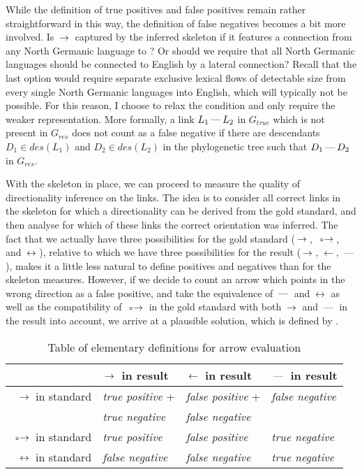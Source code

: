 While the definition of true positives and false positives remain rather straightforward in this way, the definition of false negatives becomes a bit more involved. Is  $\arrowLA$  captured by the inferred skeleton if it features a connection from any North Germanic language to ? Or should we require that all North Germanic languages should be connected to English by a lateral connection? Recall that the last option would require separate exclusive lexical flows of detectable size from every single North Germanic languages into English, which will typically not be possible. For this reason, I choose to relax the condition and only require the weaker representation. More formally, a link $L_1 \arrowLL L_2$ in $G_{true}$ which is not present in $G_{res}$ does not count as a false negative if there are descendants $D_1 \in des(L_1)$ and $D_2 \in des(L_2)$ in the phylogenetic tree such that $D_1 \arrowLL D_2$ in $G_{res}$.

With the skeleton in place, we can proceed to measure the quality of directionality inference on the links. The idea is to consider all correct links in the skeleton for which a directionality can be derived from the gold standard, and then analyse for which of these links the correct orientation was inferred. The fact that we actually have three possibilities for the gold standard ($\arrowLA$, $\arrowOA$, and $\arrowAA$), relative to which we have three possibilities for the result ($\arrowLA$, $\arrowAL$, $\arrowLL$), makes it a little less natural to define positives and negatives than for the skeleton measures. However, if we decide to count an arrow which points in the wrong direction as a false positive, and take the equivalence of $\arrowLL$ and $\arrowAA$ as well as the compatibility of $\arrowOA$ in the gold standard with both $\arrowLA$ and $\arrowLL$ in the result into account, we arrive at a plausible solution, which is defined by .

\begin{table}
\centering
\begin{tabular}{rlll}
  \hline \hline
  & $\arrowLA$ in result & $\arrowAL$ in result & $\arrowLL$ in result \\ \hline
  $\arrowLA$ in standard & \textit{true positive} + & \textit{false positive} + & \textit{false negative}\\ 
                                  & \textit{true negative} & \textit{false negative} & \\ \hline
  $\arrowOA$ in standard & \textit{true positive} & \textit{false positive} & \textit{true negative}\\ \hline
  $\arrowAA$ in standard & \textit{false negative} & \textit{false negative} & \textit{true negative}\\ \hline
\end{tabular}
 \caption{Table of elementary definitions for arrow evaluation}
 \label{arrow-eval-def}
\end{table}

